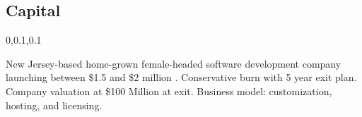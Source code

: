 
\begin{frame}{}
\section{Capital}
\vspace{-.5em}	

{\Large{}\selectfont

\hspace*{20pt}\begin{minipage}{.94\textwidth}
\vspace{4pt}
		
\begin{lightquadblockc}{0,0.1,0.1}{\parbox{21cm}{\centering \vspace{3pt}}}
\begin{center}\begin{minipage}{\textwidth}
{\Huge \setlength{\leftmargini}{30pt}\begin{enumerate}
\dmitem New Jersey-based home-grown female-headed software development company launching  between 
\$1.5 and \$2 million .
\vspace{20pt}
\dmitem Conservative burn with 5 year exit plan.
\vspace{20pt}
\dmitem Company valuation at \$100 Million at exit.
\footnotemark[1]
\vspace{20pt}
\dmitem Business model: customization, hosting, and licensing.
\vspace{20pt}
\footnotemark[2]
\end{enumerate}
}\end{minipage}
\end{center}
\end{lightquadblockc}
\end{minipage}

}

\end{frame}
